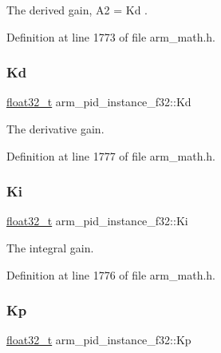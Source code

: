 The derived gain, A2 = Kd . 

Definition at line 1773 of file arm\+\_\+math.\+h.

\mbox{\label{structarm__pid__instance__f32_ad5b68fbf84d16188ae4747ff91f6f088}} 
\subsubsection{\texorpdfstring{Kd}{Kd}}
{\footnotesize\ttfamily \hyperlink{arm__math_8h_a4611b605e45ab401f02cab15c5e38715}{float32\+\_\+t} arm\+\_\+pid\+\_\+instance\+\_\+f32\+::\+Kd}

The derivative gain. 

Definition at line 1777 of file arm\+\_\+math.\+h.

\mbox{\label{structarm__pid__instance__f32_ac0feffde05fe391eeab3bf78e953830a}} 
\subsubsection{\texorpdfstring{Ki}{Ki}}
{\footnotesize\ttfamily \hyperlink{arm__math_8h_a4611b605e45ab401f02cab15c5e38715}{float32\+\_\+t} arm\+\_\+pid\+\_\+instance\+\_\+f32\+::\+Ki}

The integral gain. 

Definition at line 1776 of file arm\+\_\+math.\+h.

\mbox{\label{structarm__pid__instance__f32_aa9b9aa9e413c6cec376a9dddc9f01ebe}} 
\subsubsection{\texorpdfstring{Kp}{Kp}}
{\footnotesize\ttfamily \hyperlink{arm__math_8h_a4611b605e45ab401f02cab15c5e38715}{float32\+\_\+t} arm\+\_\+pid\+\_\+instance\+\_\+f32\+::\+Kp}

